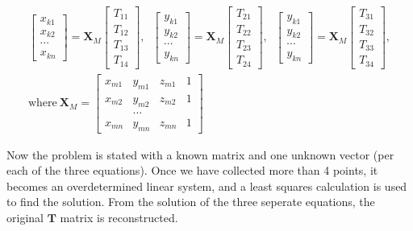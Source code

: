 \begin{gather*}
    \begin{bmatrix}
        x_{k1} \\
        x_{k2} \\
        \cdots \\
        x_{kn}
    \end{bmatrix}
    =
    \mathbf{X}_M
    \begin{bmatrix}
        T_{11} \\
        T_{12} \\
        T_{13} \\
        T_{14}
    \end{bmatrix}
    ,\;\;
    \begin{bmatrix}
        y_{k1} \\
        y_{k2} \\
        \cdots \\
        y_{kn}
    \end{bmatrix}
    =
    \mathbf{X}_M
    \begin{bmatrix}
        T_{21} \\
        T_{22} \\
        T_{23} \\
        T_{24}
    \end{bmatrix}
    ,\;\;
    \begin{bmatrix}
        y_{k1} \\
        y_{k2} \\
        \cdots \\
        y_{kn}
    \end{bmatrix}
    =
    \mathbf{X}_M
    \begin{bmatrix}
        T_{31} \\
        T_{32} \\
        T_{33} \\
        T_{34}
    \end{bmatrix}
    ,\\
    \text{where}~\mathbf{X}_M =
    \begin{bmatrix}
        x_{m1} & y_{m1} & z_{m1} & 1 \\
        x_{m2} & y_{m2} & z_{m2} & 1 \\
        &\dots & & \\
        x_{mn} & y_{mn} & z_{mn} & 1
    \end{bmatrix}
\end{gather*}

Now the problem is stated with a known matrix and one unknown vector (per each of the three equations).
Once we have collected more than 4 points, it becomes an overdetermined linear system, and a least squares calculation is used to find the solution.
From the solution of the three seperate equations, the original $\mathbf{T}$ matrix is reconstructed.


